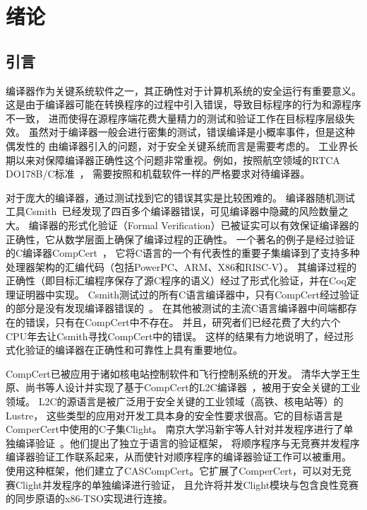 
\chapter{绪论}


\section{引言}

编译器作为关键系统软件之一，其正确性对于计算机系统的安全运行有重要意义。
这是由于编译器可能在转换程序的过程中引入错误，导致目标程序的行为和源程序不一致，
进而使得在源程序端花费大量精力的测试和验证工作在目标程序层级失效。
虽然对于编译器一般会进行密集的测试，错误编译是小概率事件，但是这种偶发性的
由编译器引入的问题，对于安全关键系统而言是需要考虑的。
工业界长期以来对保障编译器正确性这个问题非常重视。例如，按照航空领域的RTCA DO178B/C标准~\cite{brosgol2010178c}，
需要按照和机载软件一样的严格要求对待编译器。

对于庞大的编译器，通过测试找到它的错误其实是比较困难的。
编译器随机测试工具Csmith~\cite{csmith2011}已经发现了四百多个编译器错误，可见编译器中隐藏的风险数量之大。
编译器的形式化验证（Formal Verification）已被证实可以有效保证编译器的正确性，它从数学层面上确保了编译过程的正确性。
一个著名的例子是经过验证的C编译器CompCert~\cite{leroy2009formally}，
它将C语言的一个有代表性的重要子集编译到了支持多种处理器架构的汇编代码（包括PowerPC、ARM、X86和RISC-V）。
其编译过程的正确性（即目标汇编程序保存了源C程序的语义）经过了形式化验证，并在Coq定理证明器中实现。
Csmith测试过的所有C语言编译器中，只有CompCert经过验证的部分是没有发现编译器错误的~\cite{csmith2011}。
在其他被测试的主流C语言编译器中间端都存在的错误，只有在CompCert中不存在。
并且，研究者们已经花费了大约六个CPU年去让Csmith寻找CompCert中的错误。
这样的结果有力地说明了，经过形式化验证的编译器在正确性和可靠性上具有重要地位。

CompCert已被应用于诸如核电站控制软件和飞行控制系统的开发。
清华大学王生原、尚书等人设计并实现了基于CompCert的L2C编译器~\cite{shang2017key}，被用于安全关键的工业领域。
L2C的源语言是被广泛用于安全关键的工业领域（高铁、核电站等）的Lustre，
这些类型的应用对开发工具本身的安全性要求很高。它的目标语言是ComperCert中使用的C子集Clight。
南京大学冯新宇等人针对并发程序进行了单独编译验证~\cite{jiang2019towards}。他们提出了独立于语言的验证框架，
将顺序程序与无竞赛并发程序编译器验证工作联系起来，从而使针对顺序程序的编译器验证工作可以被重用。
使用这种框架，他们建立了CASCompCert。它扩展了ComperCert，可以对无竞赛Clight并发程序的单独编译进行验证，
且允许将并发Clight模块与包含良性竞赛的同步原语的x86-TSO实现进行连接。

